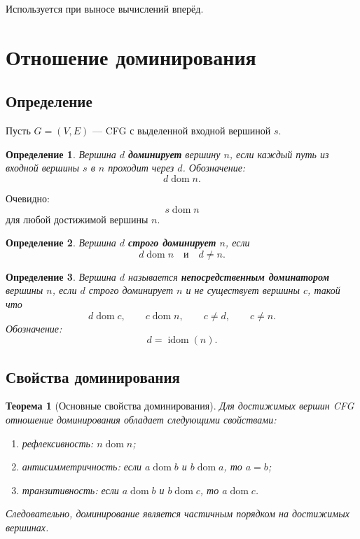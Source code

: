 \documentclass[12pt,a4paper]{article}
\newtheorem{definition}{Определение}
\newtheorem{theorem}{Теорема}
\DeclareMathOperator{\dom}{dom}
\DeclareMathOperator{\idom}{idom}
\begin{document}
Используется при выносе вычислений вперёд.

\section{Отношение доминирования}

\subsection{Определение}

Пусть $G=(V,E)$ --- CFG с выделенной входной вершиной $s$.

\begin{definition}
Вершина $d$ \textbf{доминирует} вершину $n$, если каждый путь из входной вершины $s$ в $n$ проходит через $d$.
Обозначение:
\[
d \dom n.
\]
\end{definition}

Очевидно:
\[
s \dom n
\]
для любой достижимой вершины $n$.

\begin{definition}
Вершина $d$ \textbf{строго доминирует} $n$, если
\[
d \dom n
\quad \text{и} \quad
d\neq n.
\]
\end{definition}

\begin{definition}
Вершина $d$ называется \textbf{непосредственным доминатором} вершины $n$, если $d$ строго доминирует $n$ и не существует вершины $c$, такой что
\[
d \dom c,\qquad c \dom n,\qquad c\neq d,\qquad c\neq n.
\]
Обозначение:
\[
d = \idom(n).
\]
\end{definition}

\subsection{Свойства доминирования}

\begin{theorem}[Основные свойства доминирования]
Для достижимых вершин CFG отношение доминирования обладает следующими свойствами:
\begin{enumerate}
    \item рефлексивность: $n\dom n$;
    \item антисимметричность: если $a\dom b$ и $b\dom a$, то $a=b$;
    \item транзитивность: если $a\dom b$ и $b\dom c$, то $a\dom c$.
\end{enumerate}
Следовательно, доминирование является частичным порядком на достижимых вершинах.
\end{theorem}
\end{document}
